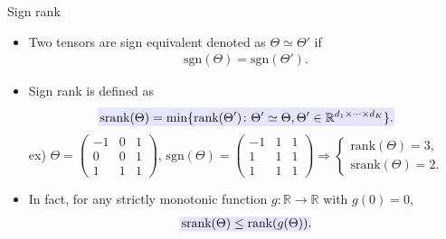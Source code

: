 \documentclass[10pt, mathserif]{beamer} %
\theoremstyle{definition}
\theoremstyle{plain}
\begin{document}
\begin{frame}{Sign rank}
\begin{itemize}
    \item  Two tensors are sign equivalent denoted as $\Theta \simeq \Theta'$ if
    \begin{align}
        \text{sgn}(\Theta) = \text{sgn}(\Theta').
    \end{align}
    \item Sign rank is defined as
    \begin{align}
    \rlap{\textcolor{blue!10}{\rule[-\dp\strutbox]{235pt}{\baselineskip}}}\,\text{srank}(\Theta) = \min\{\text{rank}(\Theta')\colon \Theta'\simeq \Theta, \Theta'\in\mathbb{R}^{d_1\times\cdots\times d_K}\}.
    \end{align}
    ex) $\Theta = \begin{pmatrix}-1&0&1\\0&0&1\\1&1&1\end{pmatrix}$, $\text{sgn}(\Theta) = \begin{pmatrix}-1&1&1\\1&1&1\\1&1&1\end{pmatrix}\Longrightarrow\begin{cases} \text{rank}(\Theta) = 3,\\ \text{srank}(\Theta) = 2.\end{cases}$\vspace*{.5cm}
    \item In fact,
for any strictly monotonic function $g\colon\mathbb{R}\rightarrow \mathbb{R}$ with $g(0) = 0$,
\[\rlap{\textcolor{blue!10}{\rule[-\dp\strutbox]{105pt}{\baselineskip}}}\,\text{srank}(\Theta)\leq \text{rank}(g(\Theta)).\]
\end{itemize}


\end{frame}
\end{document}
